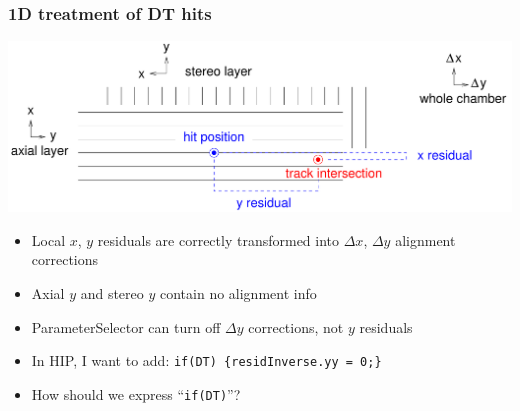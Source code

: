 \documentclass[compress]{beamer}
\begin{document}
\begin{frame}
\frametitle{1D treatment of DT hits}
\begin{center}
\includegraphics[width=0.9\linewidth]{axialstereo}
\end{center}

\vspace{-0.5 cm}
\begin{itemize}
\item Local $x$, $y$ residuals are correctly transformed into $\Delta x$, $\Delta y$ alignment corrections
\item Axial $y$ and stereo $y$ contain no alignment info
\item ParameterSelector can turn off $\Delta y$ corrections, not $y$ residuals
\item In HIP, I want to add: {\tt if(DT) \{residInverse.yy = 0;\}}
\item How should we express ``{\tt if(DT)}''?
\end{itemize}
\end{frame}
\end{document}
